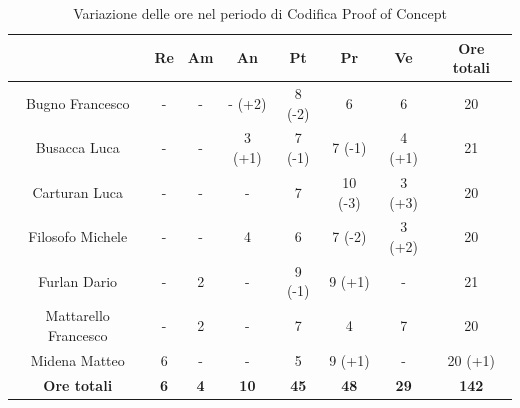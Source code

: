 \begin{table}[H]
  \centering
  \renewcommand{\arraystretch}{1.8}
  \begin{tabular}{c|c|c|c|c|c|c|c}
    \rowcolor[HTML]{125E28}
    \multicolumn{1}{c}{\color[HTML]{FFFFFF}\textbf{ Nominativo }}
                         & \multicolumn{1}{c}{\color[HTML]{FFFFFF}\textbf{ Re }}
                         & \multicolumn{1}{c}{\color[HTML]{FFFFFF}\textbf{ Am}}
                         & \multicolumn{1}{c}{\color[HTML]{FFFFFF}\textbf{ An }}
                         & \multicolumn{1}{c}{\color[HTML]{FFFFFF}\textbf{ Pt }}
                         & \multicolumn{1}{c}{\color[HTML]{FFFFFF}\textbf{ Pr }}
                         & \multicolumn{1}{c}{\color[HTML]{FFFFFF}\textbf{ Ve }}
                         & \multicolumn{1}{c}{\color[HTML]{FFFFFF}\textbf{ Ore totali }}                                                                                     \\
    \hline
    Bugno Francesco      & -                                                             & -          & - (+2)      & 8 (-2)      & 6           & 6           & 20           \\
    Busacca Luca         & -                                                             & -          & 3 (+1)      & 7 (-1)      & 7 (-1)      & 4 (+1)      & 21           \\
    Carturan Luca        & -                                                             & -          & -           & 7           & 10 (-3)     & 3 (+3)      & 20           \\
    Filosofo Michele     & -                                                             & -          & 4           & 6           & 7 (-2)      & 3 (+2)      & 20           \\
    Furlan Dario         & -                                                             & 2          & -           & 9 (-1)      & 9 (+1)      & -           & 21           \\
    Mattarello Francesco & -                                                             & 2          & -           & 7           & 4           & 7           & 20           \\
    Midena Matteo        & 6                                                             & -          & -           & 5           & 9 (+1)      & -           & 20 (+1)      \\
    \textbf{Ore totali}  & \textbf{6}                                                    & \textbf{4} & \textbf{10} & \textbf{45} & \textbf{48} & \textbf{29} & \textbf{142}
  \end{tabular}
  \caption{Variazione delle ore nel periodo di Codifica Proof of Concept}
\end{table}

